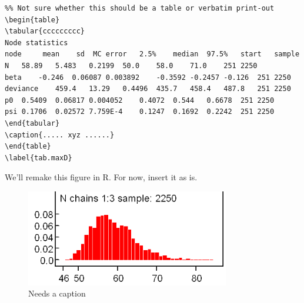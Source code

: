 \begin{verbatim}
%% Not sure whether this should be a table or verbatim print-out
\begin{table}
\tabular{ccccccccc}
Node statistics
node	 mean	 sd	 MC error	2.5%	median	97.5%	start	sample
N	58.89	5.483	0.2199	50.0	58.0	71.0	251	2250
beta	-0.246	0.06087	0.003892	-0.3592	-0.2457	-0.126	251	2250
deviance	459.4	13.29	0.4496	435.7	458.4	487.8	251	2250
p0	0.5409	0.06817	0.004052	0.4072	0.544	0.6678	251	2250
psi	0.1706	0.02572	7.759E-4	0.1247	0.1692	0.2242	251	2250
\end{tabular}
\caption{..... xyz ......}
\end{table}
\label{tab.maxD}
\end{verbatim}

We'll remake this figure in R.  For now, insert it as is.

\begin{figure}
\begin{center}
\includegraphics[width=3.5in]{Ch3/figs/Nchains}
\end{center}
\caption{Needs a caption}
\label{fig.nchains}
\end{figure}

